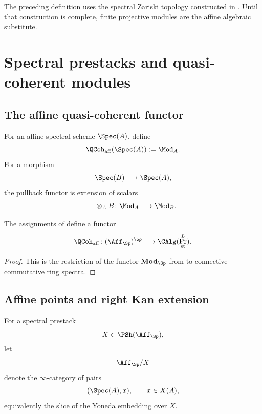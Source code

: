 \begin{remark}
\label{rem:local-free-definition-forward-reference}
The preceding definition uses the spectral Zariski topology constructed in
. Until that construction is
complete, finite projective modules are the affine algebraic substitute.
\end{remark}

\section{Spectral prestacks and quasi-coherent modules}
\label{sec:spectral-prestacks-qcoh}

\subsection{The affine quasi-coherent functor}

\begin{definition}
\label{def:affine-spectral-qcoh}
For an affine spectral scheme $\Spec(A)$, define
\[
    \QCoh_{\mathrm{aff}}(\Spec(A))
    :=
    \Mod_A.
\]
For a morphism
\[
    \Spec(B)
    \longrightarrow
    \Spec(A),
\]
the pullback functor is extension of scalars
\[
    -\otimes_A B
    \colon
    \Mod_A
    \longrightarrow
    \Mod_B.
\]
\end{definition}

\begin{proposition}
\label{prop:affine-qcoh-coefficient-system}
The assignments of  define a functor
\[
    \QCoh_{\mathrm{aff}}
    \colon
    (\Aff_{\Sp})^{\op}
    \longrightarrow
    \CAlg(\Pr^L_{\mathrm{st}}).
\]
\end{proposition}

\begin{proof}
This is the restriction of the functor
$\mathbf{Mod}_{\Sp}$ from
 to connective commutative ring
spectra.
\end{proof}

\subsection{Affine points and right Kan extension}

\begin{definition}
\label{def:affine-points-prestack}
For a spectral prestack
\[
    X\in\PSh(\Aff_{\Sp}),
\]
let
\[
    \Aff_{\Sp}/X
\]
denote the $\infty$-category of pairs
\[
    (\Spec(A),x),
    \qquad
    x\in X(A),
\]
equivalently the slice of the Yoneda embedding over $X$.
\end{definition}

